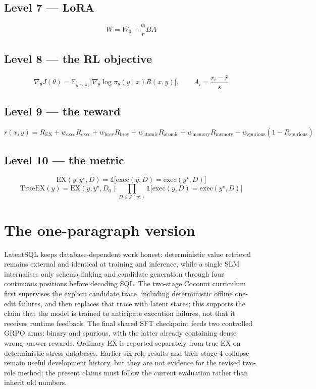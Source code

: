 \documentclass[11pt]{article}
\theoremstyle{definition}
\begin{document}
\subsection*{Level 7 --- LoRA}
\[
W = W_0 + \frac{\alpha}{r}BA
\]

\subsection*{Level 8 --- the RL objective}
\[
\nabla_\theta J(\theta) = \mathbb{E}_{y\sim\pi_\theta}\big[\nabla_\theta\log\pi_\theta(y\mid x)R(x,y)\big],\qquad
A_i = \frac{r_i-\bar r}{s}
\]

\subsection*{Level 9 --- the reward}
\[
r(x,y) = R_{\mathrm{EX}}+w_{\mathrm{exec}}R_{\mathrm{exec}}+w_{\mathrm{brev}}R_{\mathrm{brev}}+w_{\mathrm{atomic}}R_{\mathrm{atomic}}+w_{\mathrm{memory}}R_{\mathrm{memory}}-w_{\mathrm{spurious}}(1-R_{\mathrm{spurious}})
\]

\subsection*{Level 10 --- the metric}
\[
\mathrm{EX}(y,y^\star,D) = \mathbb{1}\big[\mathrm{exec}(y,D)=\mathrm{exec}(y^\star,D)\big]
\]
\[
\mathrm{TrueEX}(y)=\mathrm{EX}(y,y^\star,D_0)\prod_{D\in\mathcal I(y^\star)}\mathbb{1}\big[\mathrm{exec}(y,D)=\mathrm{exec}(y^\star,D)\big]
\]

\section{The one-paragraph version}

LatentSQL keeps database-dependent work honest: deterministic value retrieval remains external and identical at training and inference, while a single SLM internalises only schema linking and candidate generation through four continuous positions before decoding SQL. The two-stage Coconut curriculum first supervises the explicit candidate trace, including deterministic offline one-edit failures, and then replaces that trace with latent states; this supports the claim that the model is trained to anticipate execution failures, not that it receives runtime feedback. The final shared SFT checkpoint feeds two controlled GRPO arms: binary and spurious, with the latter already containing dense wrong-answer rewards. Ordinary EX is reported separately from true EX on deterministic stress databases. Earlier six-role results and their stage-$4$ collapse remain useful development history, but they are not evidence for the revised two-role method; the present claims must follow the current evaluation rather than inherit old numbers.
\end{document}

